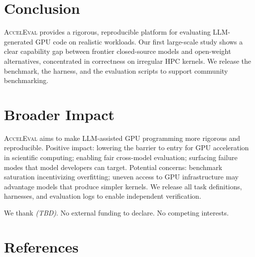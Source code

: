 \documentclass{article}
\begin{document}
\section{Conclusion}
\label{sec:conclusion}

\textsc{AccelEval} provides a rigorous, reproducible platform for evaluating LLM-generated GPU code on realistic workloads. Our first large-scale study shows a clear capability gap between frontier closed-source models and open-weight alternatives, concentrated in correctness on irregular HPC kernels. We release the benchmark, the harness, and the evaluation scripts to support community benchmarking.

\section*{Broader Impact}

\textsc{AccelEval} aims to make LLM-assisted GPU programming more rigorous and reproducible. Positive impact: lowering the barrier to entry for GPU acceleration in scientific computing; enabling fair cross-model evaluation; surfacing failure modes that model developers can target. Potential concerns: benchmark saturation incentivizing overfitting; uneven access to GPU infrastructure may advantage models that produce simpler kernels. We release all task definitions, harnesses, and evaluation logs to enable independent verification.



\begin{ack}
We thank \emph{(TBD)}. No external funding to declare. No competing interests.
\end{ack}

\section*{References}
\end{document}
